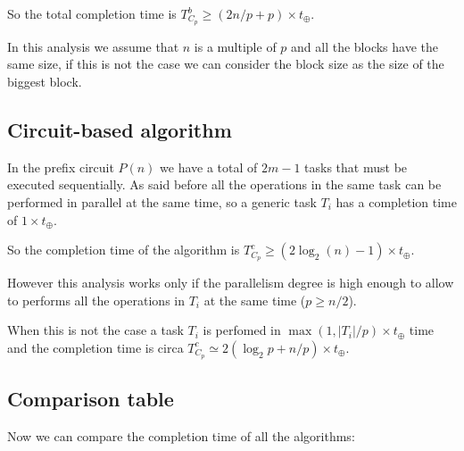 \documentclass{article}
\begin{document}
So the total completion time is $T^{b}_{C_p} \geq (2n/p + p) \times t_{\oplus}$.

\smallskip

In this analysis we assume that $n$ is a multiple of $p$ and all the blocks have the same size, if this is not the case we can consider the block size as the size of the biggest block.

\subsection{Circuit-based algorithm}

In the prefix circuit $P(n)$ we have a total of $2m-1$ tasks that must be executed sequentially. 
As said before all the operations in the same task can be performed in parallel at the same time, so a generic task $T_i$ has a completion time of $1 \times t_{\oplus}$.

So the completion time of the algorithm is $T^{c}_{C_p} \geq (2\log_{2}(n) - 1) \times t_{\oplus}$.

\smallskip

However this analysis works only if the parallelism degree is high enough to allow to performs all the operations in $T_i$ at the same time ($p \geq n/2$).

\smallskip

When this is not the case a task $T_i$ is perfomed in $\max(1, |T_i|/p) \times t_\oplus$ time and the completion time is circa $T^{c}_{C_p} \simeq 2(\log_2{p} + n/p) \times t_{\oplus}$.

\subsection{Comparison table}

Now we can compare the completion time of all the algorithms:
\end{document}
